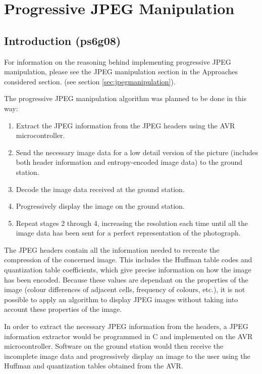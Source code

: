 \section{Progressive JPEG Manipulation}
\label{sec:implementation_progressive_jpeg}

\subsection{Introduction (ps6g08)}

For information on the reasoning behind implementing 
progressive JPEG manipulation, please see 
the JPEG manipulation section in the 
Approaches considered section. (see section \ref{sec:jpegmanipulation}).

The progressive JPEG manipulation algorithm was planned to be
done in this way:

\begin{enumerate}
	\item Extract the JPEG information from the JPEG headers 
		using the AVR microcontroller.
	\item Send the necessary image data for a low detail
	         version of the picture (includes both header information
		and entropy-encoded image data) to the ground station.
	\item Decode the image data received at the ground station.
	\item Progressively display the image on the ground station.
	\item Repeat stages 2 through 4, increasing the resolution each time
		until all the image data has been sent for a perfect 
		representation of the photograph.
\end{enumerate}

The JPEG headers contain all the information needed to
recreate the compression of the concerned image. This includes
the Huffman table codes and quantization table coefficients,
which give precise information on how the image has been encoded.
Because these values are dependant on the properties of the image
(colour differences of adjacent cells, frequency of colours, etc.), it
is not possible to apply an algorithm to display JPEG images without
taking into account these properties of the image.

In order to extract the necessary JPEG information from
the headers, a JPEG information extractor would be
programmed in C and implemented on the AVR microcontroller.
Software on the ground station would then 
receive the incomplete image data and
progressively display an image to the user using the Huffman
and quantization tables obtained from the AVR.

